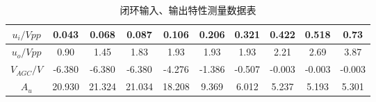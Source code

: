 \documentclass[UTF8]{ctexart}
\begin{document}
\begin{table}[H]
    \centering
    \vspace{-2em}
    \caption{闭环输入、输出特性测量数据表}
    \label{tab:8}
    \begin{tabular}{c|c|c|c|c|c|c|c|c|c}
    \hline
    $u_i/Vpp$   & 0.043  & 0.068  & 0.087  & 0.106  & 0.206  & 0.321  & 0.422  & 0.518  & 0.73   \\ \hline
    $u_o/Vpp$   & 0.90   & 1.45   & 1.83   & 1.93   & 1.93   & 1.93   & 2.21   & 2.69   & 3.87   \\ \hline
    $V_{AGC}/V$ & -6.380 & -6.380 & -6.380 & -4.276 & -1.386 & -0.507 & -0.003 & -0.003 & -0.003 \\ \hline
    $A_u$       & 20.930 & 21.324 & 21.034 & 18.208 & 9.369  & 6.012  & 5.237  & 5.193  & 5.301  \\ \hline
    \end{tabular}
\end{table}
\end{document}
